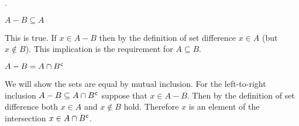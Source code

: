 \documentclass{ibl}  %
\begin{document}

\begin{problem} \pord.
\begin{exes}
\begin{exercise} 
  $A-B\subseteq A$
\end{exercise}
\begin{answer}
  This is true.
  If $x\in A-B$
  then by the definition of set difference $x\in A$ (but $x\notin B$).
  This implication is the requirement for $A\subseteq B$.  
\end{answer}
\begin{exercise}[\midlength] 
  $A-B=A\cap{B}^{\mspace{1mu}\mathsf{c}}$
\end{exercise}
\begin{answer}
  We will show the sets are equal by mutual inclusion.
  For the left-to-right inclusion $A-B\subseteq A\cap {B}^{\mspace{1mu}\mathsf{c}}$
  suppose that $x\in A-B$.
  Then by the definition of set difference both $x\in A$ and $x\notin B$ hold.
  Therefore $x$ is an element of the intersection 
  $x\in A\cap{B}^{\mspace{1mu}\mathsf{c}}$.
  

\end{answer}
\end{exes}
\end{problem}
\end{document}
